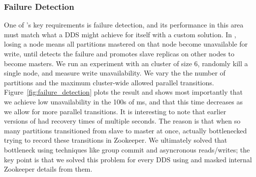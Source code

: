 \subsubsection{Failure Detection}
\label{sec:failuredetection}
%
One of \helix's key requirements is failure detection, and its performance in
this area must match what a DDS might achieve for itself with a custom solution.
In \ES, losing a node means all partitions mastered on that node become
unavailable for write, until \helix detects the failure and promotes slave
replicas on other nodes to become masters.
We run an experiment with an \ES cluster of size 6, randomly kill a single
node, and measure write unavailability.  We vary the the number
of \ES partitions and the maximum cluster-wide allowed parallel transitions.
Figure~\ref{fig:failure_detection} plots the result and shows most importantly
that we achieve low unavailability in the 100s of ms, and that this time decreases as we allow
for more parallel transitions.  It is interesting to note that earlier versions
of \helix had recovery times of multiple seconds.  The reason is that when so
many partitions transitioned from slave to master at once, \helix actually
bottlenecked trying to record these transitions in Zookeeper.  We ultimately
solved that bottleneck using techniques like group commit and asyncronous
reads/writes;  the key point is that we solved this problem for every DDS using \helix and masked
internal Zookeeper details from them.    

